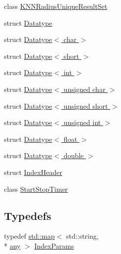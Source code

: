\begin{DoxyCompactItemize}
class \hyperlink{classcvflann_1_1KNNRadiusUniqueResultSet}{K\-N\-N\-Radius\-Unique\-Result\-Set}
\item 
struct \hyperlink{structcvflann_1_1Datatype}{Datatype}
\item 
struct \hyperlink{structcvflann_1_1Datatype_3_01char_01_4}{Datatype$<$ char $>$}
\item 
struct \hyperlink{structcvflann_1_1Datatype_3_01short_01_4}{Datatype$<$ short $>$}
\item 
struct \hyperlink{structcvflann_1_1Datatype_3_01int_01_4}{Datatype$<$ int $>$}
\item 
struct \hyperlink{structcvflann_1_1Datatype_3_01unsigned_01char_01_4}{Datatype$<$ unsigned char $>$}
\item 
struct \hyperlink{structcvflann_1_1Datatype_3_01unsigned_01short_01_4}{Datatype$<$ unsigned short $>$}
\item 
struct \hyperlink{structcvflann_1_1Datatype_3_01unsigned_01int_01_4}{Datatype$<$ unsigned int $>$}
\item 
struct \hyperlink{structcvflann_1_1Datatype_3_01float_01_4}{Datatype$<$ float $>$}
\item 
struct \hyperlink{structcvflann_1_1Datatype_3_01double_01_4}{Datatype$<$ double $>$}
\item 
struct \hyperlink{structcvflann_1_1IndexHeader}{Index\-Header}
\item 
class \hyperlink{classcvflann_1_1StartStopTimer}{Start\-Stop\-Timer}
\end{DoxyCompactItemize}
\subsection*{Typedefs}
\begin{DoxyCompactItemize}
\item 
typedef \hyperlink{core__c_8h_a035af1d430a8c9a1d115cbfb6c8e25dc}{std\-::map}$<$ std\-::string, \\*
\hyperlink{structcvflann_1_1any}{any} $>$ \hyperlink{namespacecvflann_a742b4c7076c21012054af74a9ee48289}{Index\-Params}
\end{DoxyCompactItemize}
